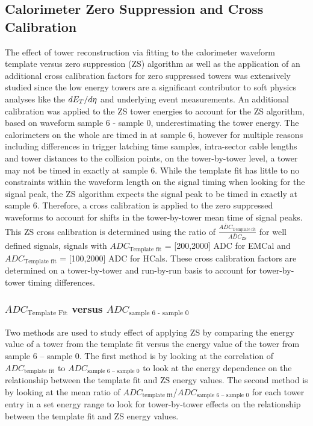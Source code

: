 \subsection{Calorimeter Zero Suppression and Cross Calibration}
\label{sec:zerosuppression}

The effect of tower reconstruction via fitting to the calorimeter waveform template versus zero suppression (ZS) algorithm as well as the application of an additional cross calibration factors for zero suppressed towers was extensively studied since the low energy towers are a significant contributor to soft physics analyses like the $\mbox{$dE_{T}/d\eta$}$ and underlying event measurements.
An additional calibration was applied to the ZS tower energies to account for the ZS algorithm, based on waveform sample 6 - sample 0, underestimating the tower energy. 
The calorimeters on the whole are timed in at sample 6, however for multiple reasons including differences in trigger latching time samples, intra-sector cable lengths and tower distances to the collision points, on the tower-by-tower level, a tower may not be timed in exactly at sample 6. 
While the template fit has little to no constraints within the waveform length on the signal timing when looking for the signal peak, the ZS algorithm expects the signal peak to be timed in exactly at sample 6. 
Therefore, a cross calibration is applied to the zero suppressed waveforms to account for shifts in the tower-by-tower mean time of signal peaks. 
This ZS cross calibration is determined using the ratio of $\frac{\overline{ADC}_{\text{Template fit}}}{\overline{ADC}_{\text{ZS}}}$ for well defined signals, signals with $ADC_{\text{Template fit}}$ = [200,2000] ADC for EMCal and $ADC_{\text{Template fit}}$ = [100,2000] ADC for HCals. 
These cross calibration factors are determined on a tower-by-tower and run-by-run basis to account for tower-by-tower timing differences. 

\subsubsection{$ADC_{\text{Template Fit}}$ versus $ADC_{\text{sample 6 - sample 0}}$}

Two methods are used to study effect of applying ZS by comparing the energy value of a tower from the template fit versus the energy value of the tower from sample 6 – sample 0. 
The first method is by looking at the correlation of $ADC_{\text{template fit}}$ to $ADC_{\text{sample 6 – sample 0}}$ to look at the energy dependence on the relationship between the template fit and ZS energy values. 
The second method is by looking at the mean ratio of $ADC_{\text{template fit}}$/$ADC_{\text{sample 6 – sample 0}}$ for each tower entry in a set energy range to look for tower-by-tower effects on the relationship between the template fit and ZS energy values.

